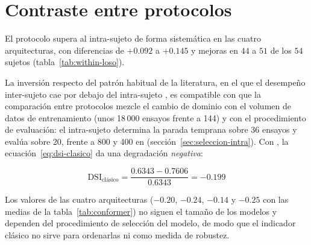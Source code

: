 \section{Contraste entre protocolos}
\label{sec:within-vs-loso}

El protocolo \loso{} supera al intra-sujeto de forma sistemática en las cuatro arquitecturas, con
diferencias de $+0.092$ a $+0.145$ y mejoras en $44$ a $51$ de los $54$ sujetos
(tabla~\ref{tab:within-loso}).

\begin{table}[H]
\centering
\caption{Contraste entre validación intra-sujeto y \loso{}, pareado por participante, con la media
de las tres semillas de cada participante en los dos protocolos. El intervalo es de percentiles del
remuestreo de participantes.}
\label{tab:within-loso}
\small
{}
\end{table}

La inversión respecto del patrón habitual de la literatura, en el que el desempeño inter-sujeto cae
por debajo del intra-sujeto \cite{zhu2025hafusenet,li2026survey,brookshire2024}, es compatible con
que la comparación entre protocolos mezcle el cambio de dominio con el volumen de datos de
entrenamiento (unos 18\,000 ensayos frente a 144) y con el procedimiento de evaluación: el
intra-sujeto determina la parada temprana sobre 36 ensayos y evalúa sobre 20, frente a 800 y 400
en \loso{} (sección~\ref{sec:seleccion-intra}). Con \eegnet{}, la ecuación~\eqref{eq:dsi-clasico} da
una degradación \emph{negativa}:

\begin{equation*}
\mathrm{DSI}_{\text{clásico}} = \frac{0.6343 - 0.7606}{0.6343} = -0.199
\end{equation*}

Los valores de las cuatro arquitecturas ($-0.20$, $-0.24$, $-0.14$ y $-0.25$ con las medias de la
tabla~\ref{tab:conformer}) no siguen el tamaño de los modelos y dependen del procedimiento de selección
del modelo, de modo que el indicador clásico no sirve para ordenarlas ni como medida de robustez.

